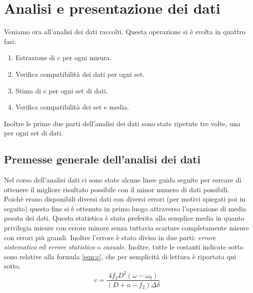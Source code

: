 \documentclass[a4paper,11pt]{article}
\begin{document}
	
	\section{Analisi e presentazione dei dati}
	Veniamo ora all'analisi dei dati raccolti. Questa operazione si è svolta in quattro fasi:
	
	\begin{enumerate}
		\item Estrazione di c per ogni misura.
		\item Verifica compatibilità dei dati per ogni set.
		\item Stima di c per ogni set di dati.
		\item Verifica compatibilità dei set e media.
	\end{enumerate}
	
	Inoltre le prime due parti dell'analisi dei dati sono state ripetute tre volte, una per ogni set di dati. 
	\subsection{Premesse generale dell'analisi dei dati}
	Nel corso dell'analisi dati ci sono state alcune linee guida seguite per cercare di ottenere il migliore risultato possibile con il minor numero di dati possibili. Poichè erano disponibili diversi dati con diversi errori (per motivi spiegati poi in seguito) questo fine si è ottenuto in primo luogo attraverso l'operazione di media pesata dei dati. Questa statistica è stata preferita alla semplice media in quanto privilegia misure con errore minore senza tuttavia scartare completamente misure con errori più grandi.
	Inoltre l'errore è stato diviso in due parti: \emph{errore sistematico} ed \emph{errore statistico} o \emph{casuale}. Inoltre, tutte le costanti indicate sotto sono relative alla formula \ref{eqn:c}, che per semplicità di lettura è riportata qui sotto.
	\begin{equation*}
	c = \dfrac{4 f_2 D^2 \left(\omega - \omega_0 \right)}{\left(D + a - f_2\right)\Delta\delta}
	\end{equation*}
\end{document}
